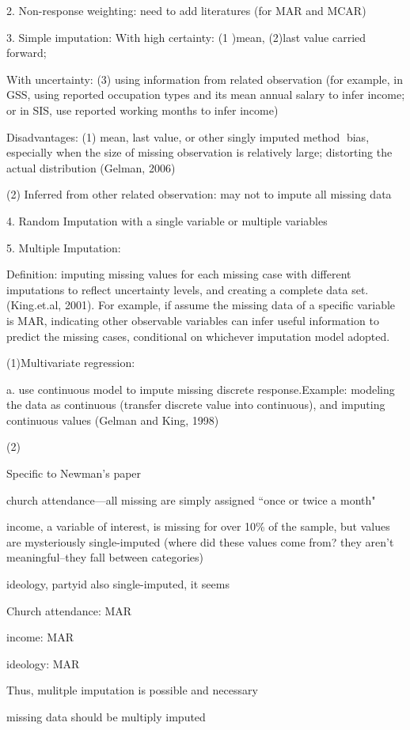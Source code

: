2. Non-response weighting: need to add literatures (for MAR and MCAR)\par

3. Simple imputation: With high certainty: (1 )mean, (2)last value carried forward;\par

With uncertainty: (3) using information from related observation (for example, in GSS, using reported occupation types and its mean annual salary to infer income; or in SIS, use reported working months to infer income)\par
 
Disadvantages:  (1) mean, last value, or other singly imputed method bias, especially when the size of missing observation is relatively large; distorting the actual distribution (Gelman, 2006)\par

(2) Inferred from other related observation: may not to impute all missing data\par

4. Random Imputation with a single variable or multiple variables\par

5. Multiple Imputation:\par

Definition: imputing missing values for each missing case with different imputations to reflect uncertainty levels, and creating a complete data set. (King.et.al, 2001). For example, if assume the missing data of a specific variable is MAR, indicating other observable variables can infer useful information to predict the missing cases,  conditional on whichever imputation model adopted.\par

(1)Multivariate regression:\par
a. use continuous model to impute missing discrete response.Example: modeling the data as continuous (transfer discrete value into continuous), and imputing continuous values (Gelman and King, 1998) \par

(2)

Specific to Newman’s paper\par
church attendance---all missing are simply assigned ``once or twice a month"

income, a variable of interest, is missing for over 10\% of the sample, but values are mysteriously single-imputed (where did these values come from? they aren't meaningful--they fall between categories)

ideology, partyid also single-imputed, it seems

Church attendance: MAR

income: MAR

ideology: MAR

Thus, mulitple imputation is possible and necessary

missing data should be multiply imputed \citep[e.g.,][]{King2001}



